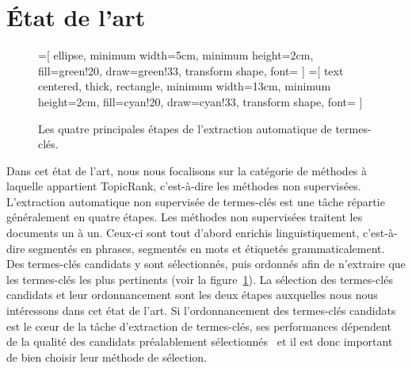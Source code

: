 \section{État de l'art}
\label{sec:etat_de_l_art}
  \begin{figure}
    =[
      ellipse,
      minimum width=5cm,
      minimum height=2cm,
      fill=green!20,
      draw=green!33,
      transform shape,
      font={\huge}
    ]
    =[
      text centered,
      thick,
      rectangle,
      minimum width=13cm,
      minimum height=2cm,
      fill=cyan!20,
      draw=cyan!33,
      transform shape,
      font={\huge\bfseries}
    ]

    \centering
    \caption{Les quatre principales étapes de l'extraction automatique de
             termes-clés. \label{fig:etapes_de_l_extraction_de_termes_cles}}
  \end{figure}
  Dans cet état de l'art, nous nous focalisons sur la catégorie de méthodes à
  laquelle appartient TopicRank, c'est-à-dire les méthodes non supervisées.
  L'extraction automatique non supervisée de termes-clés est une tâche répartie
  généralement en quatre étapes. Les méthodes non supervisées traitent les
  documents un à un. Ceux-ci sont tout d'abord enrichis linguistiquement,
  c'est-à-dire segmentés en phrases, segmentés en mots  et étiquetés
  grammaticalement. Des termes-clés candidats y sont sélectionnés, puis
  ordonnés afin de n'extraire que les termes-clés les plus pertinents (voir la
  figure~\ref{fig:etapes_de_l_extraction_de_termes_cles}). La sélection des
  termes-clés candidats et leur ordonnancement sont les deux étapes auxquelles
  nous nous intéressons dans cet état de l'art. Si l'ordonnancement des
  termes-clés candidats est le c\oe{}ur de la tâche d'extraction de termes-clés,
  ses performances dépendent de la qualité des candidats préalablement
  sélectionnés~\cite{wang2014keyphraseextractionpreprocessing} et il est donc
  important de bien choisir leur méthode de sélection.

